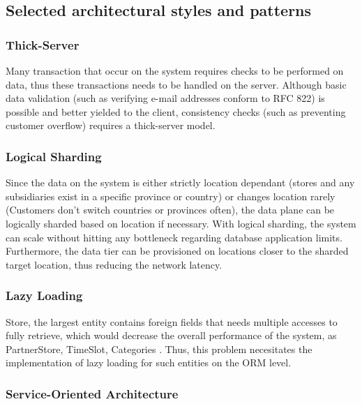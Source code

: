 \subsection{Selected architectural styles and patterns} %

\subsubsection{Thick-Server}
Many transaction that occur on the system requires checks to be performed on data, thus these transactions needs to be handled on the server.
Although basic data validation (such as verifying e-mail addresses conform to RFC 822) is possible and better yielded to the client, consistency checks (such as preventing customer overflow) requires a thick-server model.
\subsubsection{Logical Sharding}
Since the data on the system is either strictly location dependant (stores and any subsidiaries exist in a specific province or country) or changes location rarely (Customers don't switch countries or provinces often), the data plane can be logically sharded based on location if necessary.
With logical sharding, the system can scale without hitting any bottleneck regarding database application limits.
Furthermore, the data tier can be provisioned on locations closer to the sharded target location, thus reducing the network latency.

\subsubsection{Lazy Loading}
Store, the largest entity contains foreign fields that needs multiple accesses to fully retrieve, which would decrease the overall performance of the system, as PartnerStore, TimeSlot, Categories .
Thus, this problem necesitates the implementation of lazy loading for such entities on the ORM level.

\subsubsection{Service-Oriented Architecture}

